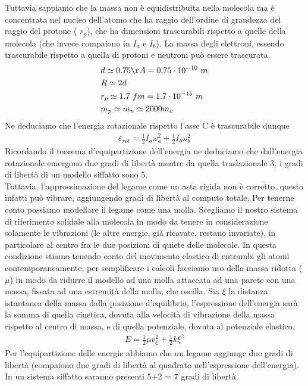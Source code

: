 \documentclass[10pt,a4paper]{article}
\begin{document}
\FloatBarrier
Tuttavia sappiamo che la massa non è equidistribuita nella molecola ma è concentrata nel nucleo dell'atomo che ha raggio dell'ordine di grandezza del raggio del protone ( \(r_p\)), che ha dimensioni trascurabili rispetto a quelle della molecola (che invece compaiono in $I_a$ e $I_b$). La massa degli elettroni, essendo trascurabile rispetto a quella di protoni e neutroni può essere trascurata.
\begin{align*} 
	&d \simeq 0.75\AA = 0.75 \cdot 10^{-10}\ m\\
	&R \simeq 2d\\
	&r_p \simeq 1.7\ fm = 1.7\cdot 10^{-15}\ m\\
	&m_p\simeq m_n \simeq 2000m_e
\end{align*} 
Ne deduciamo che l'energia rotazionale rispetto l'asse C è trascurabile dunque
\begin{align*} 
	\varepsilon_{rot} = \frac{1}{2 }I_a \omega_a^2 + \frac{1}{2 } I_b \omega_b^2
\end{align*} 
Ricordando il teorema d'equipartizione dell'energia ne deduciamo che dall'energia rotazionale emergono due gradi di libertà mentre da quella traslazionale 3, i gradi di libertà di un modello siffatto sono 5.\\
Tuttavia, l'approssimazione del legame come un asta rigida non è corretto, questo infatti può vibrare, aggiungendo gradi di libertà al computo totale. Per tenerne conto possiamo modellare il legame come una molla. Scegliamo il nostro sistema di riferimento solidale alla molecola in modo da tenere in considerazione solamente le vibrazioni (le altre energie, già ricavate, restano invariate), in particolare al centro fra le due posizioni di quiete delle molecole. In questa condizione stiamo tenendo conto del movimento elastico di entrambi gli atomi contemporaneamente, per semplificare i calcoli facciamo uso della massa ridotta ($\mu$) in modo da ridurre il modello ad una molla attaccata ad una parete con una massa, fissata ad una estremità della molla, che oscilla. Sia $\xi$ la distanza istantanea della massa dalla posizione d'equilibrio, l'espressione dell'energia sarà la somma di quella cinetica, dovuta alla velocità di vibrazione della massa rispetto al centro di massa, e di quella potenziale, dovuta al potenziale elastico. 
\begin{align*} 
	E = \frac{1}{2}\mu v_{\xi}^2+\frac{1}{2}k\xi^2
\end{align*} 
Per l'equipartizione delle energie abbiamo che un legame aggiunge due gradi di libertà (compaiono due gradi di libertà al quadrato nell'espressione dell'energia). In un sistema siffatto saranno presenti 5+2 = 7 gradi di libertà.\\
\end{document}

